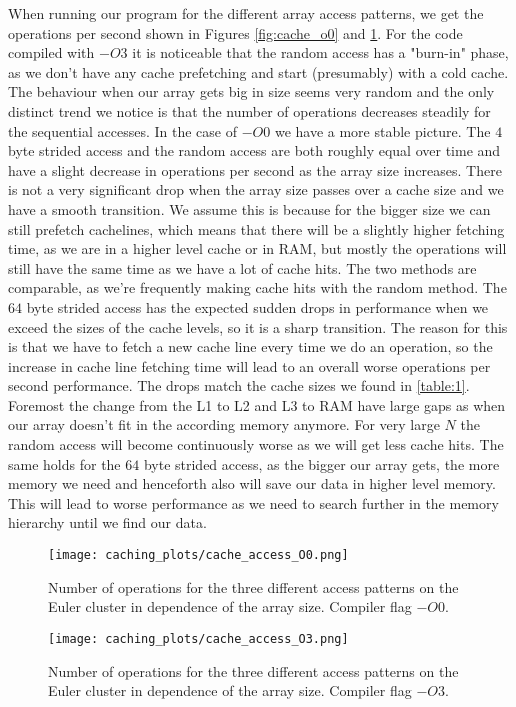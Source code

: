 \documentclass[a4paper,10pt]{article} %
\begin{document}
When running our program for the different array access patterns, we get the operations per second shown in Figures \ref{fig:cache_o0} and \ref{fig:cache_o3}. For the code compiled with $-O3$ it is noticeable that the random access has a "burn-in" phase, as we don't have any cache prefetching and start (presumably) with a cold cache. The behaviour when our array gets big in size seems very random and the only distinct trend we notice is that the number of operations decreases steadily for the sequential accesses. In the case of $-O0$ we have a more stable picture. The $4$ byte strided access and the random access are both roughly equal over time and have a slight decrease in operations per second as the array size increases. There is not a very significant drop when the array size passes over a cache size and we have a smooth transition. We assume this is because for the bigger size we can still prefetch cachelines, which means that there will be a slightly higher fetching time, as we are in a higher level cache or in RAM, but mostly the operations will still have the same time as we have a lot of cache hits. The two methods are comparable, as we're frequently making cache hits with the random method. The $64$ byte strided access has the expected sudden drops in performance when we exceed the sizes of the cache levels, so it is a sharp transition. The reason for this is that we have to fetch a new cache line every time we do an operation, so the increase in cache line fetching time will lead to an overall worse operations per second performance. The drops match the cache sizes we found in \ref{table:1}. Foremost the change from the L1 to L2 and L3 to RAM have large gaps as when our array doesn't fit in the according memory anymore. For very large $N$ the random access will become continuously worse as we will get less cache hits. The same holds for the $64$ byte strided access, as the bigger our array gets, the more memory we need and henceforth also will save our data in higher level memory. This will lead to worse performance as we need to search further in the memory hierarchy until we find our data.

\begin{figure}[h]
  \centering
  \begin{minipage}[t]{0.45\textwidth}
    \texttt{[image: caching\_plots/cache\_access\_O0.png]}
    \caption{Number of operations for the three different access patterns on the Euler cluster in dependence of the array size. Compiler flag $-O0$.}
    \label{fig:cache_o0}
  \end{minipage}
  \hfill
  \begin{minipage}[t]{0.45\textwidth}
    \texttt{[image: caching\_plots/cache\_access\_O3.png]}
    \caption{Number of operations for the three different access patterns on the Euler cluster in dependence of the array size. Compiler flag $-O3$.}
    \label{fig:cache_o3}
  \end{minipage}
\end{figure}
\end{document}
